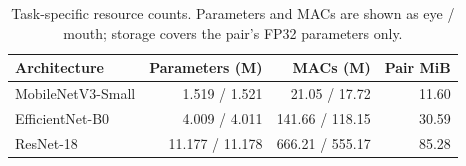 \begin{table}[htbp]
\caption{Task-specific resource counts. Parameters and MACs are shown as eye / mouth; storage covers the pair's FP32 parameters only.}\label{tab:resources}
\begin{tabularx}{\textwidth}{@{}Yrrr@{}}
\toprule
Architecture & Parameters (M) & MACs (M) & Pair MiB \\
\midrule
MobileNetV3-Small & 1.519 / 1.521 & 21.05 / 17.72 & 11.60 \\
EfficientNet-B0 & 4.009 / 4.011 & 141.66 / 118.15 & 30.59 \\
ResNet-18 & 11.177 / 11.178 & 666.21 / 555.17 & 85.28 \\
\bottomrule
\end{tabularx}
\end{table}
